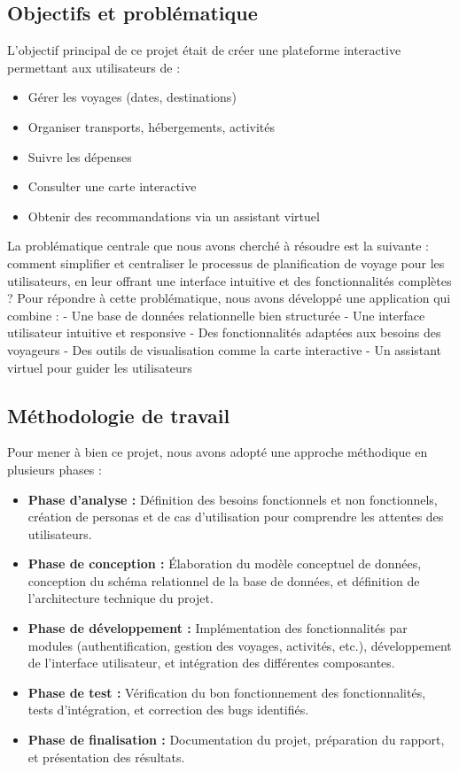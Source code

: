 \documentclass[a4paper,12pt]{article}
\begin{document}
\subsection{Objectifs et problématique}
L'objectif principal de ce projet était de créer une plateforme interactive permettant aux utilisateurs de :
\begin{itemize}
    \item Gérer les voyages (dates, destinations)
    \item Organiser transports, hébergements, activités
    \item Suivre les dépenses
    \item Consulter une carte interactive
    \item Obtenir des recommandations via un assistant virtuel
\end{itemize}


La problématique centrale que nous avons cherché à résoudre est la suivante : comment simplifier et centraliser le processus de planification de voyage pour les utilisateurs, en leur offrant une interface intuitive et des fonctionnalités complètes ? Pour répondre à cette problématique, nous avons développé une application qui
combine : - Une base de données relationnelle bien structurée - Une interface utilisateur
intuitive et responsive - Des fonctionnalités adaptées aux besoins des voyageurs - Des outils de visualisation comme la carte interactive - Un assistant virtuel pour guider les utilisateurs

\subsection{Méthodologie de travail}

Pour mener à bien ce projet, nous avons adopté une approche méthodique en plusieurs phases :

\begin{itemize}
  \item \textbf{Phase d'analyse :} Définition des besoins fonctionnels et non fonctionnels, création de personas et de cas d'utilisation pour comprendre les attentes des utilisateurs.
  
  \item \textbf{Phase de conception :} Élaboration du modèle conceptuel de données, conception du schéma relationnel de la base de données, et définition de l'architecture technique du projet.
  
  \item \textbf{Phase de développement :} Implémentation des fonctionnalités par modules (authentification, gestion des voyages, activités, etc.), développement de l'interface utilisateur, et intégration des différentes composantes.
  
  \item \textbf{Phase de test :} Vérification du bon fonctionnement des fonctionnalités, tests d'intégration, et correction des bugs identifiés.
  
  \item \textbf{Phase de finalisation :} Documentation du projet, préparation du rapport, et présentation des résultats.
\end{itemize}
\end{document}
